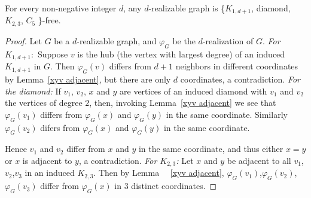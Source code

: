 \documentclass[12pt,a4paper,titlepage,openany]{report}
\begin{document}
\begin{theorem}\label{d-realizable-free}
For every non-negative integer $d$, any $d$-realizable graph is \{$K_{1,d+1}$, diamond, $K_{2,3}$, $C_5$ \}-free.
\end{theorem} 
\begin{proof} Let $G$ be a $d$-realizable graph, and $\varphi_G$ be the $d$-realization of $G$.\newline
\textit{For $K_{1,d+1}:$} Suppose $v$ is the hub (the vertex with largest degree) of an induced $K_{1,d+1}$ in $G$. Then $\varphi_G(v)$ differs from $d+1$ neighbors in different coordinates by Lemma~\ref{xyv adjacent}, but there are only $d$ coordinates, a contradiction.\newline
\textit{For the diamond:} If $v_1$, $v_2$, $x$ and $y$ are vertices of an induced diamond with $v_1$ and $v_2$ the vertices of degree $2$, then, invoking Lemma~\ref{xyv adjacent} we see that $\varphi_G(v_1)$ differs from $\varphi_G(x)$ and $\varphi_G(y)$ in the same coordinate. Similarly $\varphi_G(v_2)$ difers from $\varphi_G(x)$ and $\varphi_G(y)$ in the same coordinate.

 Hence $v_1$ and $v_2$ differ from $x$ and $y$ in the same coordinate, and thus either $x=y$ or $x$ is adjacent to $y$, a contradiction.\newline
\textit{For $K_{2,3}$:} Let $x$ and $y$ be adjacent to all $v_1$,$v_2$,$v_3$ in an induced $K_{2,3}$. Then by Lemma ~~\ref{xyv adjacent}, $\varphi_G(v_1)$,$\varphi_G(v_2)$, $\varphi_G(v_3)$ differ from $\varphi_G(x)$ in $3$ distinct coordinates. 


\end{proof}
\end{document}
